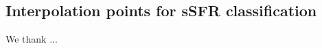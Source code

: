 \documentclass{aa}
\begin{document}
\begin{appendix} %
\section*{Interpolation points for sSFR classification}





\end{appendix}

\begin{acknowledgements}
We thank ... 
\end{acknowledgements}



\end{document}
